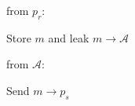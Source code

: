 \begin{bbox}[title={Functionality $\F_{channel}(p_r,p_s)$}]

\OnInput {} from $p_r$:
	\begin{renumerate}
		\item Store $m$ and leak $m \rightarrow \mathcal{A}$
	\end{renumerate}
	
\OnInput {} from $\mathcal{A}$:
	\begin{renumerate}
		\item Send $m \rightarrow p_s$
	\end{renumerate}
\end{bbox}
